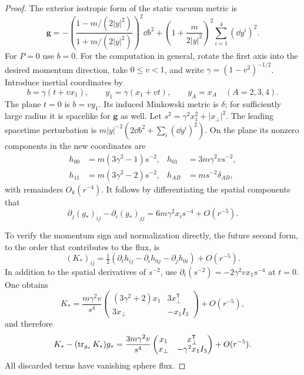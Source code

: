 \begin{proof}
The exterior isotropic form of the static vacuum metric
\cite{Tangherlini1963} is
\begin{equation}\label{four:end:tangherlini}
 \mathbf g=-\left(\frac{1-m/(2|y|^2)}{1+m/(2|y|^2)}\right)^2\dd b^2
       +\left(1+\frac{m}{2|y|^2}\right)^2\sum_{i=1}^4(\dd y^i)^2.
\end{equation}
For \(P=0\) use \(b=0\). For the computation in general, rotate the
first axis into the desired momentum direction, take \(0\le v<1\),
and write \(\gamma=(1-v^2)^{-1/2}\). Introduce inertial coordinates by
\[
 b=\gamma(t+vx_1),\qquad y_1=\gamma(x_1+vt),\qquad
 y_A=x_A\quad(A=2,3,4).
\]
The plane \(t=0\) is \(b=vy_1\). Its induced Minkowski metric is
\(\delta\); for sufficiently large radius it is spacelike for
\(\mathbf g\) as well. Let
\(s^2=\gamma^2x_1^2+|x_\perp|^2\). The leading spacetime perturbation
is \(m|y|^{-2}(2\dd b^2+\sum_i(\dd y^i)^2)\). On the plane its
nonzero components in the new coordinates are
\begin{equation}\label{four:end:boost-perturbation}
 \begin{aligned}
 h_{00}&=m(3\gamma^2-1)s^{-2},&
 h_{01}&=3m\gamma^2v s^{-2},\\
 h_{11}&=m(3\gamma^2-2)s^{-2},&
 h_{AB}&=m s^{-2}\delta_{AB},
 \end{aligned}
\end{equation}
with remainders \(O_k(r^{-4})\).
It follows by differentiating the spatial components that
\begin{equation}\label{four:end:boost-energy-integrand}
 \partial_j(g_*)_{ij}-\partial_i(g_*)_{jj}
       =6m\gamma^2 x_i s^{-4}+O(r^{-5}).
\end{equation}

To verify the momentum sign and normalization directly, the future
second form, to the order that contributes to the flux, is
\[
 (K_*)_{ij}=\tfrac12
       (\partial_t h_{ij}-\partial_i h_{0j}-\partial_j h_{0i})
       +O(r^{-5}).
\]
In addition to the spatial derivatives of \(s^{-2}\), use
\(\partial_t(s^{-2})=-2\gamma^2v x_1s^{-4}\) at \(t=0\).
One obtains
\[
 K_* =\frac{m\gamma^2v}{s^4}
 \begin{pmatrix}
 (3\gamma^2+2)x_1&3x_\perp^{\mathsf T}\\
 3x_\perp&-x_1 I_3
 \end{pmatrix}+O(r^{-5}),
\]
and therefore
\begin{equation}\label{four:end:boost-momentum-integrand}
 K_*-(\operatorname{tr}_{g_*}K_*)g_*
 =\frac{3m\gamma^2v}{s^4}
 \begin{pmatrix}
 x_1&x_\perp^{\mathsf T}\\
 x_\perp&-\gamma^2x_1 I_3
 \end{pmatrix}+O(r^{-5}).
\end{equation}
All discarded terms have vanishing sphere flux.


\end{proof}
